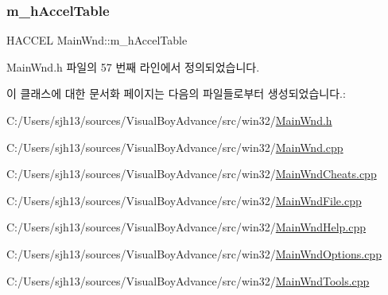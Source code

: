 \subsubsection{\texorpdfstring{m\+\_\+h\+Accel\+Table}{m\_hAccelTable}}
{\footnotesize\ttfamily H\+A\+C\+C\+EL Main\+Wnd\+::m\+\_\+h\+Accel\+Table}



Main\+Wnd.\+h 파일의 57 번째 라인에서 정의되었습니다.



이 클래스에 대한 문서화 페이지는 다음의 파일들로부터 생성되었습니다.\+:\begin{DoxyCompactItemize}
\item 
C\+:/\+Users/sjh13/sources/\+Visual\+Boy\+Advance/src/win32/\mbox{\hyperlink{_main_wnd_8h}{Main\+Wnd.\+h}}\item 
C\+:/\+Users/sjh13/sources/\+Visual\+Boy\+Advance/src/win32/\mbox{\hyperlink{_main_wnd_8cpp}{Main\+Wnd.\+cpp}}\item 
C\+:/\+Users/sjh13/sources/\+Visual\+Boy\+Advance/src/win32/\mbox{\hyperlink{_main_wnd_cheats_8cpp}{Main\+Wnd\+Cheats.\+cpp}}\item 
C\+:/\+Users/sjh13/sources/\+Visual\+Boy\+Advance/src/win32/\mbox{\hyperlink{_main_wnd_file_8cpp}{Main\+Wnd\+File.\+cpp}}\item 
C\+:/\+Users/sjh13/sources/\+Visual\+Boy\+Advance/src/win32/\mbox{\hyperlink{_main_wnd_help_8cpp}{Main\+Wnd\+Help.\+cpp}}\item 
C\+:/\+Users/sjh13/sources/\+Visual\+Boy\+Advance/src/win32/\mbox{\hyperlink{_main_wnd_options_8cpp}{Main\+Wnd\+Options.\+cpp}}\item 
C\+:/\+Users/sjh13/sources/\+Visual\+Boy\+Advance/src/win32/\mbox{\hyperlink{_main_wnd_tools_8cpp}{Main\+Wnd\+Tools.\+cpp}}\end{DoxyCompactItemize}
